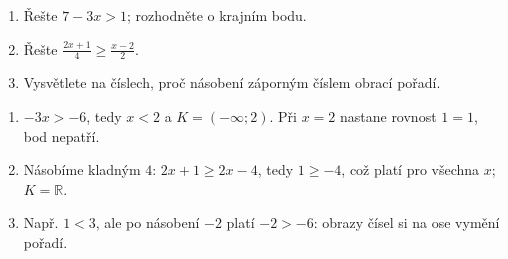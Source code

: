 \documentclass[11pt,a4paper]{article}
\begin{document}
\begin{zadaniReseniBox}
\begin{enumerate}[label=\alph*)]
\item Řešte $7-3x>1$; rozhodněte o krajním bodu.
\item Řešte $\frac{2x+1}{4}\ge\frac{x-2}{2}$.
\item Vysvětlete na číslech, proč násobení záporným číslem obrací pořadí.
\end{enumerate}
\tcblower
\begin{enumerate}[label=\alph*)]
\item $-3x>-6$, tedy $x<2$ a $K=(-\infty;2)$. Při $x=2$ nastane rovnost $1=1$, bod nepatří.
\item Násobíme kladným $4$: $2x+1\ge2x-4$, tedy $1\ge-4$, což platí pro všechna $x$; $K=\mathbb R$.
\item Např. $1<3$, ale po násobení $-2$ platí $-2>-6$: obrazy čísel si na ose vymění pořadí.
\end{enumerate}
\end{zadaniReseniBox}
\end{document}
